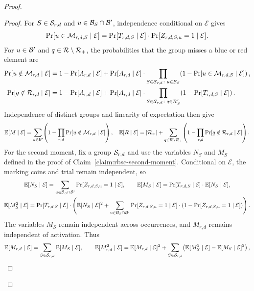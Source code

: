 \begin{proof}
\begin{proof}
For $S\in\mathcal{S}_{r,d}$ and $u\in\mathcal{B}_S\cap\mathcal{B}'$, independence conditional on $\mathcal{E}$ gives
\[
 \Pr[u\in\mathcal{M}_{r,d,S}\mid\mathcal{E}]
 =\Pr[T_{r,d,S}\mid\mathcal{E}]\cdot\Pr[Z_{r,d,S,u}=1\mid\mathcal{E}].
\]
For $u\in\mathcal{B}'$ and $q\in\mathcal{R}\setminus\mathcal{R}_+$, the probabilities that the group misses a blue or red element are
\[
 \begin{aligned}
 \Pr[u\notin\mathcal{M}_{r,d}\mid\mathcal{E}]
 &=1-\Pr[A_{r,d}\mid\mathcal{E}]+\Pr[A_{r,d}\mid\mathcal{E}]\cdot\prod_{S\in\mathcal{S}_{r,d}\colon u\in\mathcal{B}_S}\mathopen{}\left( 1-\Pr[u\in\mathcal{M}_{r,d,S}\mid\mathcal{E}] \right),\\
 \Pr[q\notin\mathcal{R}_{r,d}\mid\mathcal{E}]
 &=1-\Pr[A_{r,d}\mid\mathcal{E}]+\Pr[A_{r,d}\mid\mathcal{E}]\cdot\prod_{S\in\mathcal{S}_{r,d}\colon q\in\mathcal{R}'_S}\mathopen{}\left( 1-\Pr[T_{r,d,S}\mid\mathcal{E}] \right).
 \end{aligned}
\]
Independence of distinct groups and linearity of expectation then give
\begingroup\small
\begin{equation}\label{eq:rbsc-conditional-coverage-cost}
 \mathbb{E}[M\mid\mathcal{E}]
 =\sum_{u\in\mathcal{B}'}\mathopen{}\left( 1-\prod_{r,d}\Pr[u\notin\mathcal{M}_{r,d}\mid\mathcal{E}] \right),\quad
 \mathbb{E}[R\mid\mathcal{E}]
 =\mathopen{}\left| \mathcal{R}_+ \right|+\sum_{q\in\mathcal{R}\setminus \mathcal{R}_+}\mathopen{}\left( 1-\prod_{r,d}\Pr[q\notin\mathcal{R}_{r,d}\mid\mathcal{E}] \right).
\end{equation}
\endgroup
For the second moment, fix a group $\mathcal{S}_{r,d}$ and use the variables $N_S$ and $M_S$ defined in the proof of Claim~\ref{claim:rbsc-second-moment}. Conditional on $\mathcal{E}$, the marking coins and trial remain independent, so
\[
 \begin{gathered}
 \mathbb{E}[N_S\mid\mathcal{E}]=\sum_{u\in\mathcal{B}_S\cap\mathcal{B}'}\Pr[Z_{r,d,S,u}=1\mid\mathcal{E}],\qquad
 \mathbb{E}[M_S\mid\mathcal{E}]=\Pr[T_{r,d,S}\mid\mathcal{E}]\cdot\mathbb{E}[N_S\mid\mathcal{E}],\\
 \mathbb{E}[M_S^2\mid\mathcal{E}]=\Pr[T_{r,d,S}\mid\mathcal{E}]\cdot\mathopen{}\left( \mathbb{E}[N_S\mid\mathcal{E}]^2+\sum_{u\in\mathcal{B}_S\cap\mathcal{B}'}\Pr[Z_{r,d,S,u}=1\mid\mathcal{E}]\cdot\mathopen{}\left( 1-\Pr[Z_{r,d,S,u}=1\mid\mathcal{E}] \right) \right).
 \end{gathered}
\]
The variables $M_S$ remain independent across occurrences, and $M_{r,d}$ remains independent of activation. Thus
\[
 \begin{gathered}
 \mathbb{E}[M_{r,d}\mid\mathcal{E}]=\sum_{S\in\cS_{r,d}}\mathbb{E}[M_S\mid\mathcal{E}],\qquad
 \mathbb{E}[M_{r,d}^2\mid\mathcal{E}]=\mathbb{E}[M_{r,d}\mid\mathcal{E}]^2+\sum_{S\in\cS_{r,d}}\br{\mathbb{E}[M_S^2\mid\mathcal{E}]-\mathbb{E}[M_S\mid\mathcal{E}]^2},\\

\end{gathered}\]
\end{proof}
\end{proof}
